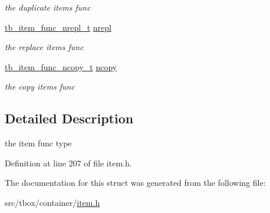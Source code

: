 \begin{DoxyCompactItemize}
\begin{DoxyCompactList}\small\item\em the duplicate items func \end{DoxyCompactList}\item 
\hypertarget{structtb__item__func__t_a56ddd8865686c67a4313e2972de1e4fb}{\hyperlink{item_8h_aefc89ff695cb47990a31e1dce121a907}{tb\-\_\-item\-\_\-func\-\_\-nrepl\-\_\-t} \hyperlink{structtb__item__func__t_a56ddd8865686c67a4313e2972de1e4fb}{nrepl}}\label{structtb__item__func__t_a56ddd8865686c67a4313e2972de1e4fb}

\begin{DoxyCompactList}\small\item\em the replace items func \end{DoxyCompactList}\item 
\hypertarget{structtb__item__func__t_a0d563359bd8d0aa328c193e6128cbb4c}{\hyperlink{item_8h_afbf7157bdf34c7aa0d4825157f39d125}{tb\-\_\-item\-\_\-func\-\_\-ncopy\-\_\-t} \hyperlink{structtb__item__func__t_a0d563359bd8d0aa328c193e6128cbb4c}{ncopy}}\label{structtb__item__func__t_a0d563359bd8d0aa328c193e6128cbb4c}

\begin{DoxyCompactList}\small\item\em the copy items func \end{DoxyCompactList}\end{DoxyCompactItemize}


\subsection{Detailed Description}
the item func type 

Definition at line 207 of file item.\-h.



The documentation for this struct was generated from the following file\-:\begin{DoxyCompactItemize}
\item 
src/tbox/container/\hyperlink{item_8h}{item.\-h}\end{DoxyCompactItemize}

